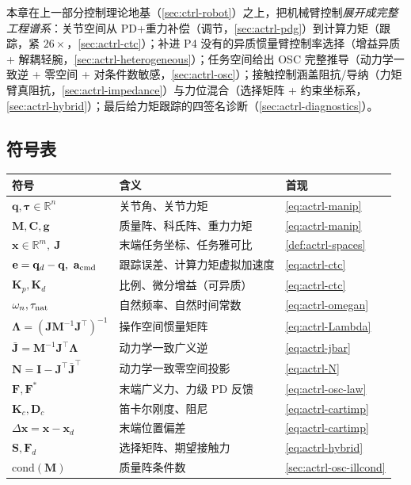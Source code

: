 本章在上一部分控制理论地基（\cref{sec:ctrl-robot}）之上，把机械臂控制\emph{展开成完整工程谱系}：关节空间从 PD+重力补偿（调节，\cref{sec:actrl-pdg}）到计算力矩（跟踪，紧 $26\times$，\cref{sec:actrl-ctc}）；补进 P4 没有的异质惯量臂控制率选择（增益异质 + 解耦轻腕，\cref{sec:actrl-heterogeneous}）；任务空间给出 OSC 完整推导（动力学一致逆 + 零空间 + 对条件数敏感，\cref{sec:actrl-osc}）；接触控制涵盖阻抗/导纳（力矩臂真阻抗，\cref{sec:actrl-impedance}）与力位混合（选择矩阵 + 约束坐标系，\cref{sec:actrl-hybrid}）；最后给力矩跟踪的四签名诊断（\cref{sec:actrl-diagnostics}）。

\subsection*{符号表}
\begin{center}\small
\begin{longtable}{p{} p{} p{}}
\toprule
符号 & 含义 & 首现 \\
\midrule
\endhead
$\mathbf{q},\boldsymbol{\tau}\in\mathbb{R}^n$ & 关节角、关节力矩 & \cref{eq:actrl-manip} \\
$\mathbf{M},\mathbf{C},\mathbf{g}$ & 质量阵、科氏阵、重力力矩 & \cref{eq:actrl-manip} \\
$\mathbf{x}\in\mathbb{R}^m,\ \mathbf{J}$ & 末端任务坐标、任务雅可比 & \cref{def:actrl-spaces} \\
$\mathbf{e}=\mathbf{q}_d-\mathbf{q},\ \mathbf{a}_{\rm cmd}$ & 跟踪误差、计算力矩虚拟加速度 & \cref{eq:actrl-ctc} \\
$\mathbf{K}_p,\mathbf{K}_d$ & 比例、微分增益（可异质） & \cref{eq:actrl-ctc} \\
$\omega_n,\tau_{\rm nat}$ & 自然频率、自然时间常数 & \cref{eq:actrl-omegan} \\
$\boldsymbol{\Lambda}=(\mathbf{J}\mathbf{M}^{-1}\mathbf{J}^\top)^{-1}$ & 操作空间惯量矩阵 & \cref{eq:actrl-Lambda} \\
$\bar{\mathbf{J}}=\mathbf{M}^{-1}\mathbf{J}^\top\boldsymbol{\Lambda}$ & 动力学一致广义逆 & \cref{eq:actrl-jbar} \\
$\mathbf{N}=\mathbf{I}-\mathbf{J}^\top\bar{\mathbf{J}}^\top$ & 动力学一致零空间投影 & \cref{eq:actrl-N} \\
$\mathbf{F},\mathbf{F}^*$ & 末端广义力、力级 PD 反馈 & \cref{eq:actrl-osc-law} \\
$\mathbf{K}_c,\mathbf{D}_c$ & 笛卡尔刚度、阻尼 & \cref{eq:actrl-cartimp} \\
$\Delta\mathbf{x}=\mathbf{x}-\mathbf{x}_d$ & 末端位置偏差 & \cref{eq:actrl-cartimp} \\
$\mathbf{S},\mathbf{F}_d$ & 选择矩阵、期望接触力 & \cref{eq:actrl-hybrid} \\
$\mathrm{cond}(\mathbf{M})$ & 质量阵条件数 & \cref{sec:actrl-osc-illcond} \\
\bottomrule
\end{longtable}
\end{center}


